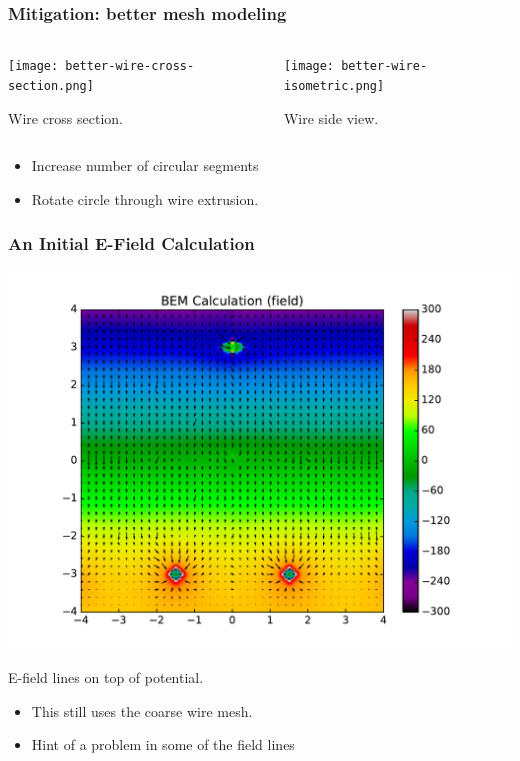 \documentclass[xcolor=dvipsnames]{beamer}
\begin{document}
\begin{frame}
  \frametitle{Mitigation: better mesh modeling}
  \begin{columns}
    \begin{column}{0.5\textwidth}
      \begin{center}
        \texttt{[image: better-wire-cross-section.png]}

        \scriptsize Wire cross section.
      \end{center}
    \end{column}
    \begin{column}{0.5\textwidth}
      \begin{center}
        \texttt{[image: better-wire-isometric.png]}

        \scriptsize Wire side view.
      \end{center}
    \end{column}
  \end{columns}
  \begin{itemize}
  \item Increase number of circular segments
  \item Rotate circle through wire extrusion.
  \end{itemize}
\end{frame}

\begin{frame}
  \frametitle{An Initial E-Field Calculation}
  \begin{center}
    \includegraphics[height=0.6\textheight]{uboone-drift-field-pot-tight.pdf}
    
    \scriptsize E-field lines on top of potential.
  \end{center}
  
  \begin{itemize}
  \item This still uses the coarse wire mesh.
  \item Hint of a problem in some of the field lines
  \end{itemize}
\end{frame}
\end{document}
